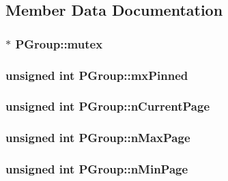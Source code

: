 \subsection{Member Data Documentation}
\hypertarget{struct_p_group_a7173aa723aa61d6b1f79cde2f7d0f74d}{
\subsubsection[{mutex}]{$\ast$ P\-Group\-::mutex}}\label{struct_p_group_a7173aa723aa61d6b1f79cde2f7d0f74d}
\hypertarget{struct_p_group_ac7cdffac1c20d260e8230dba4ab05cea}{
\subsubsection[{mx\-Pinned}]{\setlength{\rightskip}{0pt plus 5cm}unsigned int P\-Group\-::mx\-Pinned}}\label{struct_p_group_ac7cdffac1c20d260e8230dba4ab05cea}
\hypertarget{struct_p_group_a532a09e3e6bf7a20a934764b4bd698a5}{
\subsubsection[{n\-Current\-Page}]{\setlength{\rightskip}{0pt plus 5cm}unsigned int P\-Group\-::n\-Current\-Page}}\label{struct_p_group_a532a09e3e6bf7a20a934764b4bd698a5}
\hypertarget{struct_p_group_a219ff89d38529cbb6b47e60f41896f41}{
\subsubsection[{n\-Max\-Page}]{\setlength{\rightskip}{0pt plus 5cm}unsigned int P\-Group\-::n\-Max\-Page}}\label{struct_p_group_a219ff89d38529cbb6b47e60f41896f41}
\hypertarget{struct_p_group_aedf84324cb7138c9f9ee31814e8274c0}{
\subsubsection[{n\-Min\-Page}]{\setlength{\rightskip}{0pt plus 5cm}unsigned int P\-Group\-::n\-Min\-Page}}\label{struct_p_group_aedf84324cb7138c9f9ee31814e8274c0}
